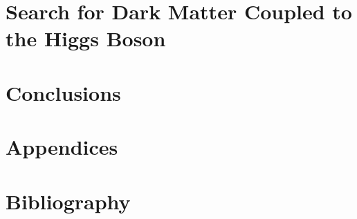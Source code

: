 \documentclass[11pt,openright,oneside,letterpaper,onecolumn]{report} %
\begin{document}
\part{Search for Dark Matter Coupled to the Higgs Boson}
\label{sec:analysis-part}


\part{Conclusions}
\label{sec:conclusions}


\part{Appendices}
\appendix


\part{Bibliography}
\nocite{*}


\end{document}
